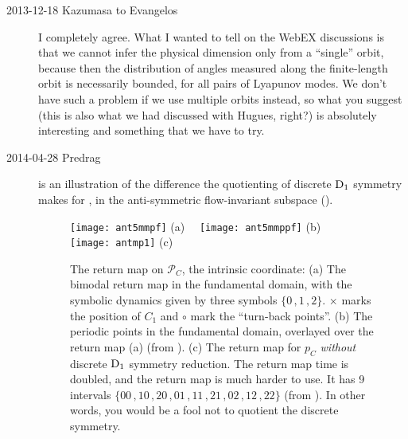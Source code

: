 \begin{description}
\item[2013-12-18 Kazumasa to Evangelos]
  I completely agree.
  What I wanted to tell on the WebEX discussions is that
  we cannot infer the physical dimension only from a ``single'' orbit,
  because then the distribution of angles
  measured along the finite-length orbit is necessarily bounded,
  for all pairs of Lyapunov modes.
  We don't have such a problem if we use multiple orbits instead,
  so what you suggest (this is also what we had discussed with Hugues, right?)
  is absolutely interesting and something that we have to try.

\item[2014-04-28 Predrag]                               \toCB
   is an illustration of the difference the quotienting of
  discrete $\textrm{D}_{1}$ symmetry makes for \KS, in the anti-symmetric
  flow-invariant subspace ().

  \begin{figure}[tbp] %
    \centering
    \hspace{-0.22\textwidth}
    \texttt{[image: ant5mmpf]}
    \hspace{-0.22\textwidth} (a)~~ \hspace{0.22\textwidth}
    \texttt{[image: ant5mmppf]}
    \hspace{-0.22\textwidth} (b)~~
    \\
    \hspace{0.22\textwidth}
    \texttt{[image: antmp1]}
    \hspace{-0.22\textwidth} (c)~~
    \caption[]{
      The {\Poincare} return map on $\mathcal{P}_C$,
      the intrinsic coordinate:
      (a) The bimodal return map in the fundamental domain,
      with the symbolic dynamics given by three symbols $\{0\,,1\,,2\}$.
      $\times$ marks the position of $C_1$ and $\circ$ mark
      the ``turn-back points''.
      (b)
      The periodic points in the fundamental domain,
      overlayed over the return map (a)
      (from ).
      (c)
      The return map for $p_C$ \emph{without} discrete $\textrm{D}_{1}$
      symmetry reduction. The return map time is doubled, and the
      return map is much harder to use. It has 9 intervals
      $\{
      00\,,10\,,20\,,
      01\,,11\,,21\,,
      02\,,12\,,22
      \}$
      (from ).
      In other words, you would be a fool not to quotient the discrete symmetry.
    }
    \label{f:antmn1}
  \end{figure}


\end{description}


